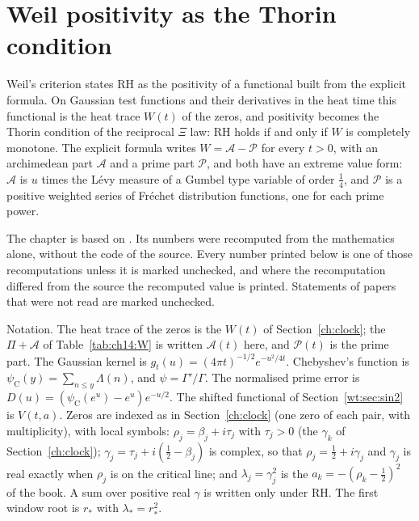 \chapter{Weil positivity as the Thorin condition}\label{chap:wt}

Weil's criterion states RH as the positivity of a functional built from the explicit formula. On Gaussian test functions and their derivatives in the heat time this functional is the heat trace $W(t)$ of the zeros, and positivity becomes the Thorin condition of the reciprocal $\Xi$ law: RH holds if and only if $W$ is completely monotone. The explicit formula writes $W=\mathcal A-\mathcal P$ for every $t>0$, with an archimedean part $\mathcal A$ and a prime part $\mathcal P$, and both have an extreme value form: $\mathcal A$ is $u$ times the L\'evy measure of a Gumbel type variable of order $\frac14$, and $\mathcal P$ is a positive weighted series of Fr\'echet distribution functions, one for each prime power.

The chapter is based on \cite{P26wt}. Its numbers were recomputed from the mathematics alone, without the code of the source. Every number printed below is one of those recomputations unless it is marked unchecked, and where the recomputation differed from the source the recomputed value is printed. Statements of papers that were not read are marked unchecked.

Notation. The heat trace of the zeros is the $W(t)$ of Section~\ref{ch:clock}; the $\Pi+\mathcal A$ of Table~\ref{tab:ch14:W} is written $\mathcal A(t)$ here, and $\mathcal P(t)$ is the prime part. The Gaussian kernel is $g_t(u)=(4\pi t)^{-1/2}e^{-u^2/4t}$. Chebyshev's function is $\psi_{\mathrm C}(y)=\sum_{n\le y}\Lambda(n)$, and $\psi=\Gamma'/\Gamma$. The normalised prime error is $D(u)=(\psi_{\mathrm C}(e^u)-e^u)e^{-u/2}$. The shifted functional of Section~\ref{wt:sec:sin2} is $V(t,a)$. Zeros are indexed as in Section~\ref{ch:clock} (one zero of each pair, with multiplicity), with local symbols: $\rho_j=\beta_j+i\tau_j$ with $\tau_j>0$ (the $\gamma_k$ of Section~\ref{ch:clock}); $\gamma_j=\tau_j+i(\frac12-\beta_j)$ is complex, so that $\rho_j=\frac12+i\gamma_j$ and $\gamma_j$ is real exactly when $\rho_j$ is on the critical line; and $\lambda_j=\gamma_j^2$ is the $a_k=-(\rho_k-\frac12)^2$ of the book. A sum over positive real $\gamma$ is written only under RH. The first window root is $r_*$ with $\lambda_*=r_*^2$.

